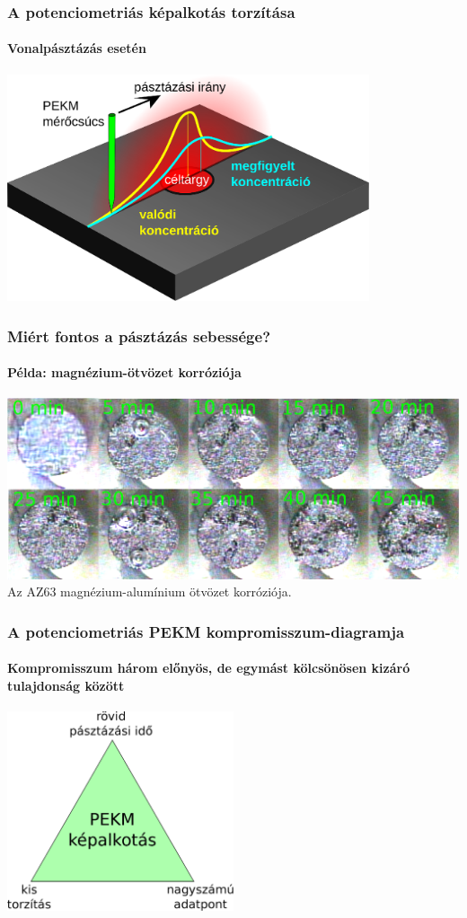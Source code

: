 \documentclass{beamer}
\begin{document}
\begin{frame}
        \frametitle{A potenciometriás képalkotás torzítása}
        \framesubtitle{Vonalpásztázás esetén}
        \centering
        \includegraphics[width=0.8\textwidth]{distortion2.eps}
\end{frame}

\begin{frame}
        \frametitle{Miért fontos a pásztázás sebessége?}
        \framesubtitle{Példa: magnézium-ötvözet korróziója}
        \includegraphics[width=1\textwidth]{timelapse.eps}\\
\centering
Az AZ63 magnézium-alumínium ötvözet korróziója.
\end{frame}

\begin{frame}
\frametitle{A potenciometriás PEKM kompromisszum-diagramja}
\framesubtitle{Kompromisszum három előnyös, de egymást kölcsönösen kizáró tulajdonság között}
\begin{center}
\includegraphics[width=0.5\textwidth]{trade-off.eps}
\end{center}
\end{frame}
\end{document}
